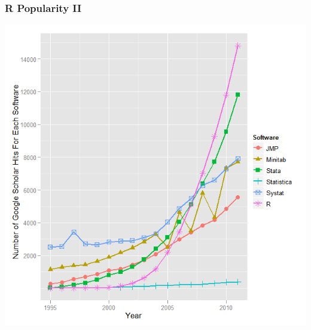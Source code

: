 \documentclass{beamer}
\begin{document}
\begin{frame}
\frametitle{R Popularity II}
\vspace{-.1in}
\begin{center}
\includegraphics[height=.77\paperheight]{googlescholar}
\end{center}
\end{frame}
\end{document}
